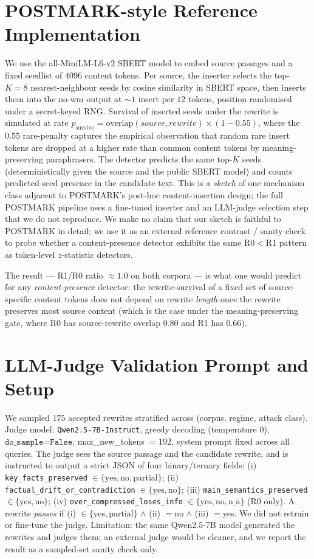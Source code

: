 \documentclass[11pt]{article}
\begin{document}
\section{POSTMARK-style Reference Implementation}
\label{app:postmark}
We use the all-MiniLM-L6-v2 SBERT model to embed source passages and a
fixed seedlist of $4096$ content tokens. Per source, the inserter selects
the top-$K{=}8$ nearest-neighbour seeds by cosine similarity in SBERT
space, then inserts them into the no-wm output at $\sim\!1$ insert per
$12$ tokens, position randomised under a secret-keyed RNG. Survival of
inserted seeds under the rewrite is simulated at rate
$p_{\text{survive}} = \text{overlap}(source, rewrite)\times(1 - 0.55)$,
where the $0.55$ rare-penalty captures the empirical observation that
random rare insert tokens are dropped at a higher rate than common
content tokens by meaning-preserving paraphrasers. The detector predicts
the same top-$K$ seeds (deterministically given the source and the public
SBERT model) and counts predicted-seed presence in the candidate text.
This is a \emph{sketch} of one mechanism class adjacent to POSTMARK's
post-hoc content-insertion design; the full POSTMARK pipeline uses a
fine-tuned inserter and an LLM-judge selection step that we do not
reproduce. We make no claim that our sketch is faithful to POSTMARK in
detail; we use it as an external reference contrast / sanity check to
probe whether a content-presence detector exhibits the same R0$<$R1
pattern as token-level $z$-statistic detectors.

The result --- R1/R0 ratio $\approx 1.0$ on both corpora --- is what one
would predict for any \emph{content-presence} detector: the rewrite-survival
of a fixed set of source-specific content tokens does not depend on rewrite
\emph{length} once the rewrite preserves most source content (which is the
case under the meaning-preserving gate, where R0 has source-rewrite
overlap $0.80$ and R1 has $0.66$).

\section{LLM-Judge Validation Prompt and Setup}
\label{app:judge}
We sampled $175$ accepted rewrites stratified across (corpus, regime,
attack class). Judge model: \texttt{Qwen2.5-7B-Instruct}, greedy decoding
(temperature $0$), $\texttt{do\_sample=False}$, max\_new\_tokens
$=192$, system prompt fixed across all queries. The judge sees the
source passage and the candidate rewrite, and is instructed to output a
strict JSON of four binary/ternary fields: (i) \texttt{key\_facts\_preserved}
$\in\{\text{yes},\text{no},\text{partial}\}$; (ii)
\texttt{factual\_drift\_or\_contradiction} $\in\{\text{yes},\text{no}\}$;
(iii) \texttt{main\_semantics\_preserved} $\in\{\text{yes},\text{no}\}$;
(iv) \texttt{over\_compressed\_loses\_info} $\in\{\text{yes},\text{no},\text{n\_a}\}$
(R0 only). A rewrite \emph{passes} if (i) $\in\{\text{yes},\text{partial}\}$
$\wedge$ (ii) $=$no $\wedge$ (iii) $=$yes. We did not retrain or
fine-tune the judge. Limitation: the same Qwen2.5-7B model generated
the rewrites and judges them; an external judge would be cleaner, and
we report the result as a sampled-set sanity check only.
\end{document}
